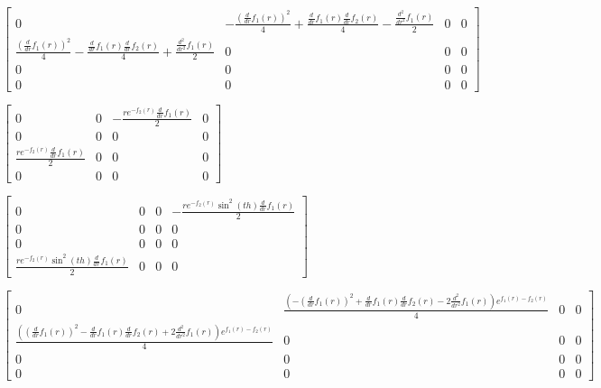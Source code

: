 \documentclass[11pt]{article}
\begin{document}
    
    $\displaystyle \left[\begin{matrix}0 & - \frac{\left(\frac{d}{d r} f_{1}{\left(r \right)}\right)^{2}}{4} + \frac{\frac{d}{d r} f_{1}{\left(r \right)} \frac{d}{d r} f_{2}{\left(r \right)}}{4} - \frac{\frac{d^{2}}{d r^{2}} f_{1}{\left(r \right)}}{2} & 0 & 0\\\frac{\left(\frac{d}{d r} f_{1}{\left(r \right)}\right)^{2}}{4} - \frac{\frac{d}{d r} f_{1}{\left(r \right)} \frac{d}{d r} f_{2}{\left(r \right)}}{4} + \frac{\frac{d^{2}}{d r^{2}} f_{1}{\left(r \right)}}{2} & 0 & 0 & 0\\0 & 0 & 0 & 0\\0 & 0 & 0 & 0\end{matrix}\right]$

    
    $\displaystyle \left[\begin{matrix}0 & 0 & - \frac{r e^{- f_{2}{\left(r \right)}} \frac{d}{d r} f_{1}{\left(r \right)}}{2} & 0\\0 & 0 & 0 & 0\\\frac{r e^{- f_{2}{\left(r \right)}} \frac{d}{d r} f_{1}{\left(r \right)}}{2} & 0 & 0 & 0\\0 & 0 & 0 & 0\end{matrix}\right]$

    
    $\displaystyle \left[\begin{matrix}0 & 0 & 0 & - \frac{r e^{- f_{2}{\left(r \right)}} \sin^{2}{\left(th \right)} \frac{d}{d r} f_{1}{\left(r \right)}}{2}\\0 & 0 & 0 & 0\\0 & 0 & 0 & 0\\\frac{r e^{- f_{2}{\left(r \right)}} \sin^{2}{\left(th \right)} \frac{d}{d r} f_{1}{\left(r \right)}}{2} & 0 & 0 & 0\end{matrix}\right]$

    
    $\displaystyle \left[\begin{matrix}0 & \frac{\left(- \left(\frac{d}{d r} f_{1}{\left(r \right)}\right)^{2} + \frac{d}{d r} f_{1}{\left(r \right)} \frac{d}{d r} f_{2}{\left(r \right)} - 2 \frac{d^{2}}{d r^{2}} f_{1}{\left(r \right)}\right) e^{f_{1}{\left(r \right)} - f_{2}{\left(r \right)}}}{4} & 0 & 0\\\frac{\left(\left(\frac{d}{d r} f_{1}{\left(r \right)}\right)^{2} - \frac{d}{d r} f_{1}{\left(r \right)} \frac{d}{d r} f_{2}{\left(r \right)} + 2 \frac{d^{2}}{d r^{2}} f_{1}{\left(r \right)}\right) e^{f_{1}{\left(r \right)} - f_{2}{\left(r \right)}}}{4} & 0 & 0 & 0\\0 & 0 & 0 & 0\\0 & 0 & 0 & 0\end{matrix}\right]$
\end{document}
